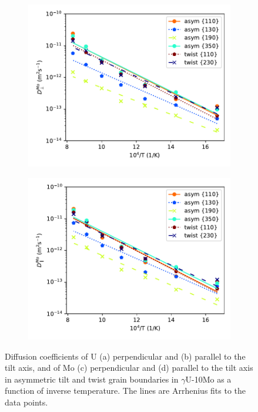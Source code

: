 \documentclass{elsarticle}
\providecommand{\DIFadd}[1]{{\protect\color{blue} \sf #1}} %
\providecommand{\DIFaddFL}[1]{\DIFadd{#1}} %
\begin{document}
\begin{figure}[!ht]
\begin{subfigure}{0.49\textwidth}
	\centering
	\caption{}
	\includegraphics[width=\textwidth]{asym_twist_Mo_Dx.pdf}
\end{subfigure}
\begin{subfigure}{0.49\textwidth}
	\centering
	\caption{}
	\includegraphics[width=\textwidth]{asym_twist_Mo_Dz.pdf}
\end{subfigure}
\caption{\DIFaddFL{Diffusion coefficients of U (a) perpendicular and (b) parallel to the tilt axis, and of Mo (c) perpendicular and (d) parallel to the tilt axis in asymmetric tilt and twist grain boundaries in $\gamma$U-10Mo as a function of inverse temperature. The lines are Arrhenius fits to the data points.}}
\label{fig:asym}
\end{figure}
\end{document}
